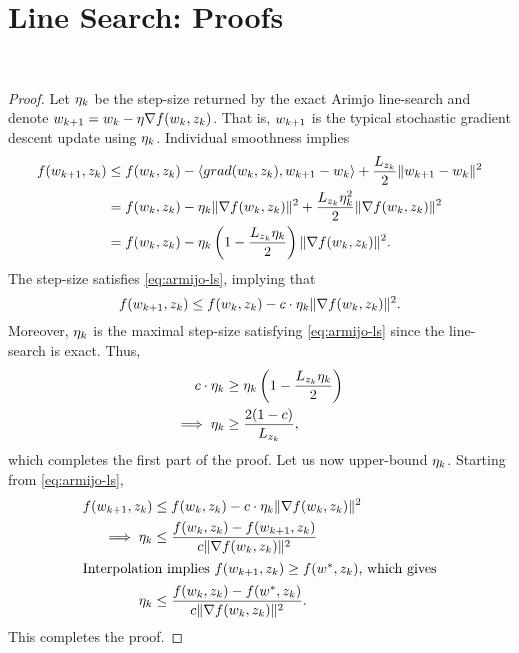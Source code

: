 
\section{Line Search: Proofs}~\label{app:line-search}

\stepSizeBound*
\begin{proof}
    Let \( \eta_k \) be the step-size returned by the exact Arimjo line-search and denote \( w_{k+1} = w_k - \eta \nabla f(w_k,z_{k}) \).
    That is, \( w_{k+1} \) is the typical stochastic gradient descent update using \( \eta_k \).
    Individual smoothness implies
    \begin{align*}
        f(w_{k+1}, z_{k}) &\leq f(w_k, z_{k}) - \left\langle grad(w_k, z_{k}), w_{k+1} - w_k\right\rangle + \frac{L_{z_{k}}}{2}\|w_{k+1} - w_k\|^2\\
                     &= f(w_k, z_{k}) - \eta_k \|\nabla f(w_k, z_{k})\|^2 + \frac{L_{z_{k}} \eta_k^2}{2}\|\nabla f(w_k, z_{k})\|^2\\
                     &= f(w_k, z_{k}) - \eta_k \left(1 - \frac{L_{z_{k}} \eta_k}{2}\right)\|\nabla f(w_k, z_{k})\|^2.
    \end{align*}
    The step-size satisfies \autoref{eq:armijo-ls}, implying that
    \[ f(w_{k+1}, z_{k}) \leq f(w_k, z_{k}) - c \cdot \eta_k \|\nabla f(w_k, z_{k})\|^2. \]
    Moreover, \( \eta_k \) is the maximal step-size satisfying \autoref{eq:armijo-ls} since the line-search is exact.
    Thus,
    \begin{align*}
        c \cdot \eta_k &\geq \eta_k \left(1 - \frac{L_{z_{k}} \eta_k}{2}\right)\\
        \implies \eta_k &\geq \frac{2(1-c)}{L_{z_{k}}},
    \end{align*}
    which completes the first part of the proof.
    Let us now upper-bound \( \eta_k \). 
    Starting from \autoref{eq:armijo-ls}, 
    \begin{align*}
        f(w_{k+1}, z_{k}) &\leq f(w_k, z_{k}) - c \cdot \eta_k \|\nabla f(w_k, z_{k})\|^2\\
        \implies \eta_k &\leq \frac{f(w_k, z_{k}) - f(w_{k+1}, z_{k})}{c \|\nabla f(w_k, z_{k})\|^2}\\
        \intertext{Interpolation implies \( f(w_{k+1}, z_{k}) \geq f(w^*, z_{k}) \), which gives}
        \eta_k &\leq \frac{f(w_k, z_{k}) - f(w^*, z_{k})}{c \|\nabla f(w_k, z_{k})\|^2}.
    \end{align*}
    This completes the proof.
\end{proof}


